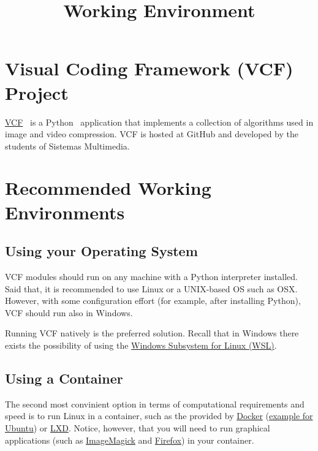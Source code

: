 

\title{Working Environment}

\maketitle

\tableofcontents

\section{Visual Coding Framework (VCF) Project}
\href{https://github.com/Sistemas-Multimedia/VCF}{VCF}~\cite{vruiz__VCF}
is a Python~\cite{python} application that implements a collection of
algorithms used in image and video compression. VCF is hosted at
GitHub and developed by the students of Sistemas Multimedia.

\section{Recommended Working Environments}

\subsection{Using your Operating System}
VCF modules should run on any machine with a Python interpreter
installed. Said that, it is recommended to use Linux or a
UNIX-based OS such as OSX. However, with some configuration effort
(for example, after installing Python), VCF should run also in
Windows.

Running VCF natively is the preferred solution. Recall that in Windows
there exists the possibility of using the
\href{https://learn.microsoft.com/en-us/windows/wsl/install}{Windows
  Subsystem for Linux (WSL)}.

\subsection{Using a Container}
The second most convinient option in terms of computational
requirements and speed is to run Linux in a container, such
as the provided by \href{https://hub.docker.com/}{Docker}
(\href{https://hub.docker.com/_/ubuntu}{example for Ubuntu})
or \href{https://linuxcontainers.org/}{LXD}. Notice, however, that you
will need to run graphical applications (such
as \href{https://linuxcontainers.org/}{ImageMagick}
and \href{https://www.mozilla.org/firefox}{Firefox}) in your
container.

